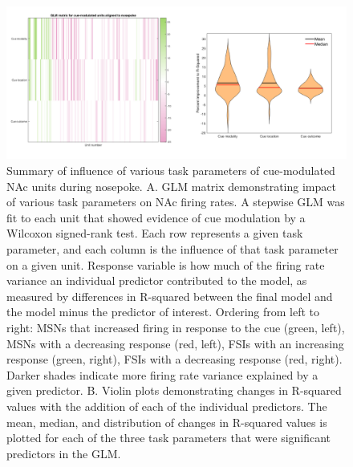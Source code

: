 \documentclass[11pt]{article}
\begin{document}
\begin{figure}[h]
\centering
\includegraphics[width=\textwidth]{Fig 9 - NP GLM.png}
\caption{Summary of influence of various task parameters of cue-modulated NAc units during nosepoke. A. GLM matrix demonstrating impact of various task parameters on NAc firing rates. A stepwise GLM was fit to each unit that showed evidence of cue modulation by a Wilcoxon signed-rank test. Each row represents a given task parameter, and each column is the influence of that task parameter on a given unit. Response variable is how much of the firing rate variance an individual predictor contributed to the model, as measured by differences in R-squared between the final model and the model minus the predictor of interest. Ordering from left to right: MSNs that increased firing in response to the cue (green, left), MSNs with a decreasing response (red, left), FSIs with an increasing response (green, right), FSIs with a decreasing response (red, right). Darker shades indicate more firing rate variance explained by a given predictor. B. Violin plots demonstrating changes in R-squared values with the addition of each of the individual predictors. The mean, median, and distribution of changes in R-squared values is plotted for each of the three task parameters that were significant predictors in the GLM.}
\label{fig:NP_GLM}
\end{figure}
\end{document}
